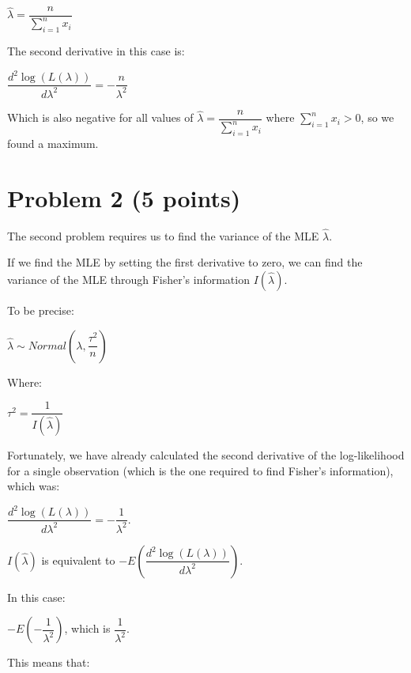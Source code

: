 \documentclass[12pt]{article}\usepackage[]{graphicx}\usepackage[]{color}
\begin{document}
$\hat{\lambda} = \dfrac{n}{\sum_{i=1}^{n} x_i}$

\bigskip

The second derivative in this case is:

\bigskip

$\dfrac{d^2 \log(L(\lambda))}{d \lambda^2} = - \dfrac{n}{\lambda^2}$

\bigskip

Which is also negative for all values of $\hat{\lambda} = \dfrac{n}{\sum_{i=1}^{n} x_i}$ where $\sum_{i=1}^{n} x_i > 0$, so we found a maximum.



\section*{Problem 2 (5 points)}

The second problem requires us to find the variance of the MLE $\hat{\lambda}$.

If we find the MLE by setting the first derivative to zero, we can find the variance of the MLE through Fisher's information $I(\hat{\lambda})$.

To be precise:

\bigskip

$\hat{\lambda} \sim Normal(\lambda,\dfrac{\tau^2}{n})$

\bigskip

Where:

\bigskip

$\tau^2 =  \dfrac{1}{I(\hat{\lambda})}$

\bigskip

Fortunately, we have already calculated the second derivative of the log-likelihood for a single observation (which is the one required to find Fisher's information), which was:

\bigskip

$\dfrac{d^2 \log(L(\lambda))}{d \lambda^2} = - \dfrac{1}{\lambda^2}$.

\bigskip

$I(\hat{\lambda})$ is equivalent to $- E(\dfrac{d^2 \log(L(\lambda))}{d \lambda^2})$.

\bigskip

In this case:

\bigskip

$- E(- \dfrac{1}{\lambda^2})$, which is $\dfrac{1}{\lambda^2}$.

\bigskip

This means that:
\end{document}

